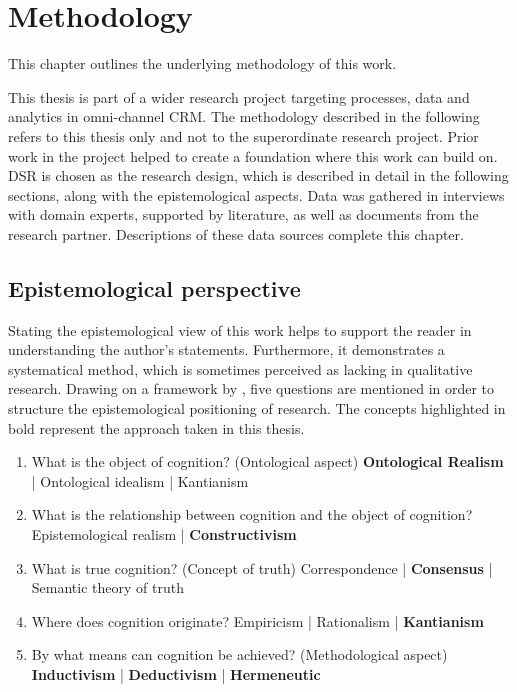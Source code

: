 \chapter{Methodology}
This chapter outlines the underlying methodology of this work.

This thesis is part of a wider research project targeting processes, data and analytics in omni-channel CRM. The methodology described in the following refers to this thesis only and not to the superordinate research project. Prior work in the project helped to create a foundation where this work can build on. \acrfull{DSR} is chosen as the research design, which is described in detail in the following sections, along with the epistemological aspects. Data was gathered in interviews with domain experts, supported by literature, as well as documents from the research partner. Descriptions of these data sources complete this chapter. 


	\section{Epistemological perspective}
Stating the epistemological view of this work helps to support the reader in understanding the author's statements. Furthermore, it demonstrates a systematical method, which is sometimes perceived as lacking in qualitative research. Drawing on a framework by \cite{becker2007epistemological}, five questions are mentioned in order to structure the epistemological positioning of research. The concepts highlighted in bold represent the approach taken in this thesis. 

\begin{enumerate}
	\item What is the object of cognition? (Ontological aspect)
		\subitem \textbf{Ontological Realism} | Ontological idealism  | Kantianism
	\item What is the relationship between cognition and the object of cognition?
		\subitem Epistemological realism | \textbf{Constructivism}
	\item What is true cognition? (Concept of truth)
		\subitem Correspondence |  \textbf{Consensus} |  Semantic theory of truth
	\item Where does cognition originate?
	\subitem Empiricism | Rationalism | \textbf{Kantianism}
	\item By what means can cognition be achieved? (Methodological aspect)
		\subitem \textbf{Inductivism} | \textbf{Deductivism} | \textbf{Hermeneutic}
\end{enumerate}

